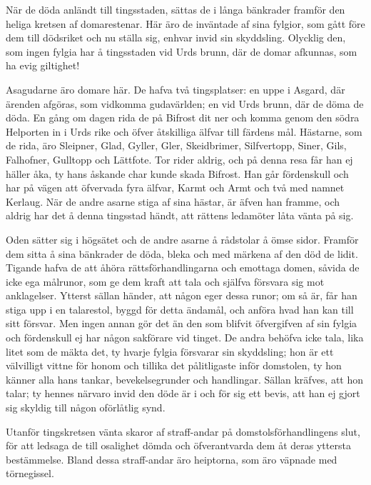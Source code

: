 När de döda anländt till tingsstaden, sättas de i långa bänkrader
framför den heliga kretsen af domarestenar. Här äro de inväntade af sina
fylgior, som gått före dem till dödsriket och nu ställa sig, enhvar
invid sin skyddsling. Olycklig den, som ingen fylgia har å tingsstaden
vid Urds brunn, där de domar afkunnas, som ha evig giltighet!

Asagudarne äro domare här. De hafva två tingsplatser: en uppe i Asgard,
där ärenden afgöras, som vidkomma gudavärlden; en vid Urds brunn, där de
döma de döda. En gång om dagen rida de på Bifrost dit ner och komma
genom den södra Helporten in i Urds rike och öfver åtskilliga älfvar
till färdens mål. Hästarne, som de rida, äro Sleipner, Glad, Gyller,
Gler, Skeidbrimer, Silfvertopp, Siner, Gils, Falhofner, Gulltopp och
Lättfote. Tor rider aldrig, och på denna resa får han ej häller åka, ty
hans åskande char kunde skada Bifrost. Han går fördenskull och har på
vägen att öfvervada fyra älfvar, Karmt och Armt och två med namnet
Kerlaug. När de andre asarne stiga af sina hästar, är äfven han framme,
och aldrig har det å denna tingsstad händt, att rättens ledamöter låta
vänta på sig.

\protect\hypertarget{lb1625905.xhtmlux5cux23start183}{}{}\protect\hypertarget{lb1625905.xhtmlux5cux23start183-a}{}{}\protect\hypertarget{lb1625905.xhtmlux5cux23start183-b}{}{}\protect\hypertarget{lb1625905.xhtmlux5cux23start183-c}{}{}\protect\hypertarget{lb1625905.xhtmlux5cux23start183-d}{}{}

Oden sätter sig i högsätet och de andre asarne å rådstolar å ömse sidor.
Framför dem sitta å sina bänkrader de döda, bleka och med märkena af den
död de lidit. Tigande hafva de att åhöra rättsförhandlingarna och
emottaga domen, såvida de icke ega målrunor, som ge dem kraft att tala
och själfva försvara sig mot anklagelser. Ytterst sällan händer, att
någon eger dessa runor; om så är, får han stiga upp i en talarestol,
byggd för detta ändamål, och anföra hvad han kan till sitt försvar. Men
ingen annan gör det än den som blifvit öfvergifven af sin fylgia och
fördenskull ej har någon sakförare vid tinget. De andra behöfva icke
tala, lika litet som de mäkta det, ty hvarje fylgia försvarar sin
skyddsling; hon är ett välvilligt vittne för honom och tillika det
pålitligaste inför domstolen, ty hon känner alla hans tankar,
bevekelsegrunder och handlingar. Sällan kräfves, att hon talar; ty
hennes närvaro invid den döde är i och för sig ett bevis, att han ej
gjort sig skyldig till någon oförlåtlig synd.

Utanför tingskretsen vänta skaror af straff-andar på
domstolsförhandlingens slut, för att ledsaga de till osalighet dömda och
öfverantvarda dem åt deras yttersta bestämmelse. Bland dessa
straff-andar äro heiptorna, som äro väpnade med törnegissel.

